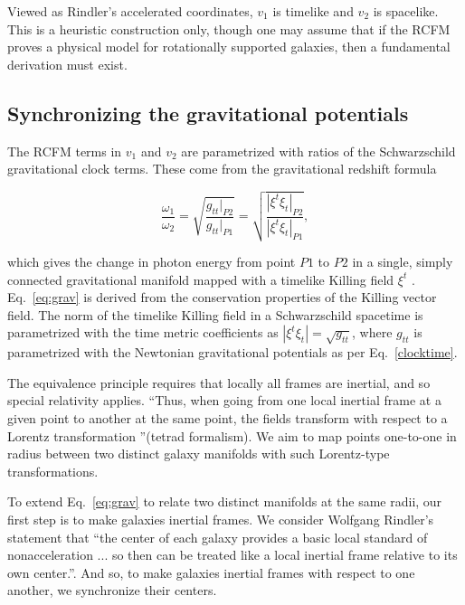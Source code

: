 \documentclass[reprint,%
 amsmath,amssymb,
 aps,
]{revtex4-1}
\begin{document}
 
 
  
  Viewed as    Rindler's accelerated coordinates\cite{MTW,Wald, rindler2013essential}, 
     $v_1$   is  timelike   and $v_2$ is spacelike. This is a heuristic construction only, though one may assume that if the RCFM proves a physical model for rotationally supported galaxies, then a fundamental derivation must exist. 

 
    
 
\subsection{Synchronizing the gravitational potentials \label{sec:gravDets}}

  


 
The RCFM  terms in  $v_1$ and $v_2$ are parametrized with ratios of  the    Schwarzschild gravitational clock terms. These come from the gravitational redshift formula

\begin{equation}
       \frac{\omega_1}{\omega_2}  =\sqrt{\frac{g_{tt}|_{P2}}{g_{tt}|_{P1}}} =\sqrt{\frac{|\xi^t\xi_{t}|_{P2}}{|\xi^t\xi_{t}|_{P1}}},
      \label{eq:grav}
    \end{equation} 
    
which    gives the change in  photon energy  from point $P1$ to $P2$ in a single, simply connected gravitational   manifold mapped with a timelike Killing field $\xi^t$ \cite{Wald}.    Eq.~\ref{eq:grav} is derived from the conservation properties of the Killing vector field.  The norm of the timelike Killing field in a Schwarzschild spacetime is parametrized with the time metric coefficients as $|\xi^t\xi_{t}|=\sqrt{g_{tt}}$, where $g_{tt}$    is  parametrized with the Newtonian gravitational potentials as per
    Eq.~\ref{clocktime}. 


 The equivalence principle requires that locally all frames are inertial, and so special relativity applies.  ``Thus, when going from
one local inertial frame at a given point to another at the same point, the fields transform
with respect to a Lorentz transformation ''\cite{jetzer}(tetrad formalism). We aim to map points one-to-one in radius between two distinct galaxy manifolds with such Lorentz-type transformations. 

To extend  Eq.~\ref{eq:grav} to  relate two distinct manifolds at the same radii,    our first step is to make galaxies inertial frames.   We consider  Wolfgang Rindler's statement that        ``the center of each galaxy provides a basic local standard of nonacceleration ... so then can be treated like a local inertial frame relative to its own center.''\cite{rindler2013essential}.
  And so,   to make galaxies inertial frames with respect to one another, we   synchronize their centers. 
    
\end{document}
